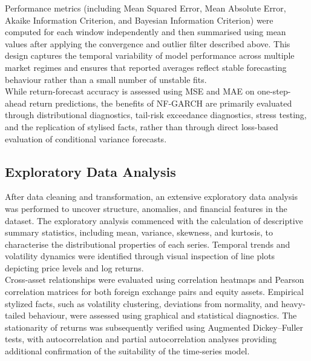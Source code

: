 \documentclass[oneside,12pt]{CUEDthesisPSnPDF}
\begin{document}
\medskip
\noindent
Performance metrics (including Mean Squared Error, Mean Absolute Error, Akaike Information Criterion, and Bayesian Information Criterion) were computed for each window independently and then summarised using mean values after applying the convergence and outlier filter described above. This design captures the temporal variability of model performance across multiple market regimes and ensures that reported averages reflect stable forecasting behaviour rather than a small number of unstable fits.\\

While return-forecast accuracy is assessed using MSE and MAE on one-step-ahead return predictions, the benefits of NF-GARCH are primarily evaluated through distributional diagnostics, tail-risk exceedance diagnostics, stress testing, and the replication of stylised facts, rather than through direct loss-based evaluation of conditional variance forecasts.\\


\subsection{Exploratory Data Analysis}
\noindent 
After data cleaning and transformation, an extensive exploratory data analysis was performed to uncover structure, anomalies, and financial features in the dataset. The exploratory analysis commenced with the calculation of descriptive summary statistics, including mean, variance, skewness, and kurtosis, to characterise the distributional properties of each series. Temporal trends and volatility dynamics were identified through visual inspection of line plots depicting price levels and log returns. \\

Cross-asset relationships were evaluated using correlation heatmaps and Pearson correlation matrices for both foreign exchange pairs and equity assets. Empirical stylized facts, such as volatility clustering, deviations from normality, and heavy-tailed behaviour, were assessed using graphical and statistical diagnostics. The stationarity of returns was subsequently verified using Augmented Dickey–Fuller tests, with autocorrelation and partial autocorrelation analyses providing additional confirmation of the suitability of the time-series model.\\
\end{document}
